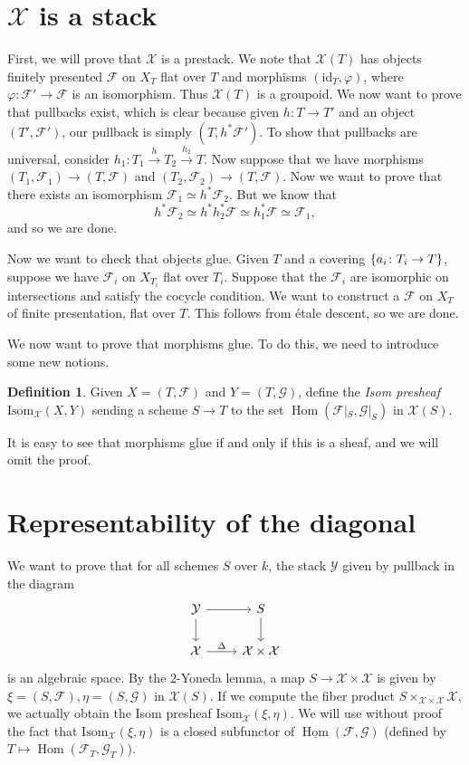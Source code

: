 \documentclass[leqno, openany]{memoir}
\theoremstyle{definition}
\newtheorem{defn}[thm]{Definition}
\theoremstyle{remark}
\theoremstyle{plain}
\theoremstyle{definition}
\theoremstyle{remark}
\newcommand{\mc}[1]{\mathcal{#1}}
\newcommand{\mr}[1]{\mathrm{#1}}
\newcommand{\ul}[1]{\underline{#1}}
\DeclareMathOperator{\Hom}{Hom}
\begin{document}
\section{$\mc{X}$ is a stack}%
\label{sec:_x_is_a_stack}

First, we will prove that $\mc{X}$ is a prestack. We note that $\mc{X}(T)$ has objects finitely presented $\mc{F}$ on $X_T$ flat over $T$ and morphisms $(\mr{id}_T, \varphi)$, where $\varphi \colon \mc{F}' \to \mc{F}$ is an isomorphism. Thus $\mc{X}(T)$ is a groupoid. We now want to prove that pullbacks exist, which is clear because given $h \colon T \to T'$ and an object $(T', \mc{F}')$, our pullback is simply $(T, h^* \mc{F}')$. To show that pullbacks are universal, consider $h_1 \colon T_1 \xrightarrow{h} T_2 \xrightarrow{h_2} T$. Now suppose that we have morphisms $(T_1, \mc{F}_1) \to (T, \mc{F})$ and $(T_2, \mc{F}_2) \to (T, \mc{F})$. Now we want to prove that there exists an isomorphism $\mc{F}_1 \simeq h^* \mc{F}_2$. But we know that 
\[ h^* \mc{F}_2 \simeq h^* h_2^* \mc{F} \simeq h_1^* \mc{F} \simeq \mc{F}_1, \]
and so we are done.

Now we want to check that objects glue. Given $T$ and a covering $\qty{a_i \colon T_i \to T}$, suppose we have $\mc{F}_i$ on $X_{T_i}$ flat over $T_i$. Suppose that the $\mc{F}_i$ are isomorphic on intersections and satisfy the cocycle condition. We want to construct a $\mc{F}$ on $X_T$ of finite presentation, flat over $T$. This follows from \'etale descent, so we are done.

We now want to prove that morphisms glue. To do this, we need to introduce some new notions.
\begin{defn}
    Given $X = (T, \mc{F})$ and $Y = (T, \mc{G})$, define the \textit{Isom presheaf} $\mr{Isom}_{\mc{X}}(X, Y)$ sending a scheme $S \to T$ to the set $\Hom(\mc{F}|_S, \mc{G}|_S)$ in $\mc{X}(S)$.
\end{defn}
It is easy to see that morphisms glue if and only if this is a sheaf, and we will omit the proof.

\section{Representability of the diagonal}%
\label{sec:representability_of_the_diagonal}

We want to prove that for all schemes $S$ over $k$, the stack $\mc{Y}$ given by pullback in the diagram
\begin{equation*}
\begin{tikzcd}
    \mc{Y} \ar{r} \ar{d} & S \ar{d} \\
    \mc{X} \ar{r}{\Delta} & \mc{X} \times \mc{X}
\end{tikzcd}
\end{equation*}
is an algebraic space. By the $2$-Yoneda lemma, a map $S \to \mc{X} \times \mc{X}$ is given by $\xi = (S, \mc{F}), \eta = (S, \mc{G})$ in $\mc{X}(S)$. If we compute the fiber product $S \times_{\mc{X} \times \mc{X}} \mc{X}$, we actually obtain the Isom presheaf $\mr{Isom}_{\mc{X}}(\xi, \eta)$. We will use without proof the fact that $\mr{Isom}_{\mc{X}}(\xi, \eta)$ is a closed subfunctor of $\ul{\Hom}(\mc{F}, \mc{G})$ (defined by $T \mapsto \Hom(\mc{F}_T, \mc{G}_T)$).
\end{document}
